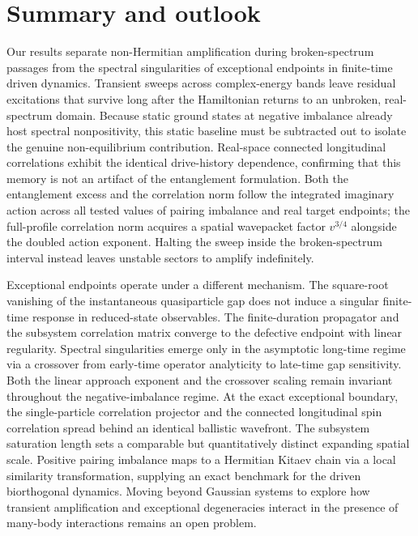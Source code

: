 \documentclass[aps,prb,reprint,superscriptaddress,amsmath,amssymb,floatfix]{revtex4-2}
\begin{document}
\section{Summary and outlook}
\label{sec:summary}

Our results separate non-Hermitian amplification during broken-spectrum passages from the spectral singularities of exceptional endpoints in finite-time driven dynamics. Transient sweeps across complex-energy bands leave residual excitations that survive long after the Hamiltonian returns to an unbroken, real-spectrum domain. Because static ground states at negative imbalance already host spectral nonpositivity, this static baseline must be subtracted out to isolate the genuine non-equilibrium contribution. Real-space connected longitudinal correlations exhibit the identical drive-history dependence, confirming that this memory is not an artifact of the entanglement formulation. Both the entanglement excess and the correlation norm follow the integrated imaginary action across all tested values of pairing imbalance and real target endpoints; the full-profile correlation norm acquires a spatial wavepacket factor $v^{3/4}$ alongside the doubled action exponent. Halting the sweep inside the broken-spectrum interval instead leaves unstable sectors to amplify indefinitely.

Exceptional endpoints operate under a different mechanism.
%
The square-root vanishing of the instantaneous quasiparticle gap does not induce a singular finite-time response in reduced-state observables. The finite-duration propagator and the subsystem correlation matrix converge to the defective endpoint with linear regularity. Spectral singularities emerge only in the asymptotic long-time regime via a crossover from early-time operator analyticity to late-time gap sensitivity. Both the linear approach exponent and the crossover scaling remain invariant throughout the negative-imbalance regime.
%
At the exact exceptional boundary, the single-particle correlation projector and the connected longitudinal spin correlation spread behind an identical ballistic wavefront. The subsystem saturation length sets a comparable but quantitatively distinct expanding spatial scale. Positive pairing imbalance maps to a Hermitian Kitaev chain via a local similarity transformation, supplying an exact benchmark for the driven biorthogonal dynamics. Moving beyond Gaussian systems to explore how transient amplification and exceptional degeneracies interact in the presence of many-body interactions remains an open problem.
\end{document}

